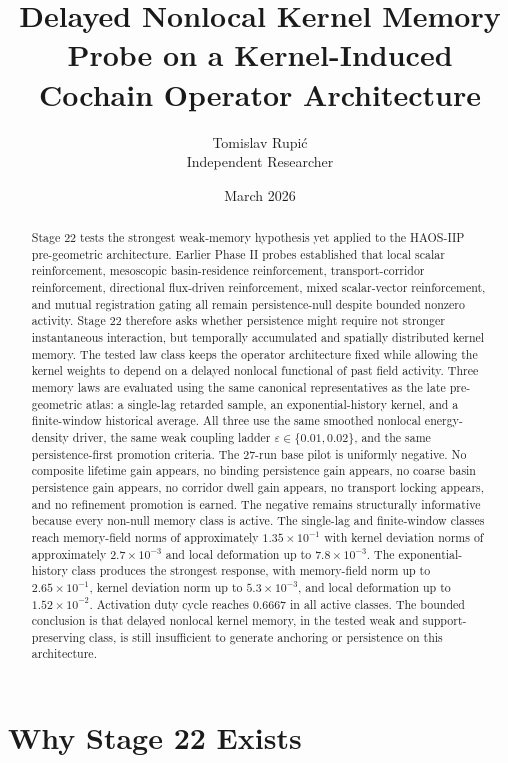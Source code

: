 \documentclass[11pt]{article}
\title{Delayed Nonlocal Kernel Memory Probe on a Kernel-Induced Cochain Operator Architecture}
\author{Tomislav Rupi\'c \\ Independent Researcher}
\date{March 2026}
\begin{document}
\maketitle

\begin{abstract}
Stage 22 tests the strongest weak-memory hypothesis yet applied to the HAOS-IIP pre-geometric architecture. Earlier Phase II probes established that local scalar reinforcement, mesoscopic basin-residence reinforcement, transport-corridor reinforcement, directional flux-driven reinforcement, mixed scalar-vector reinforcement, and mutual registration gating all remain persistence-null despite bounded nonzero activity. Stage 22 therefore asks whether persistence might require not stronger instantaneous interaction, but temporally accumulated and spatially distributed kernel memory. The tested law class keeps the operator architecture fixed while allowing the kernel weights to depend on a delayed nonlocal functional of past field activity. Three memory laws are evaluated using the same canonical representatives as the late pre-geometric atlas: a single-lag retarded sample, an exponential-history kernel, and a finite-window historical average. All three use the same smoothed nonlocal energy-density driver, the same weak coupling ladder $\varepsilon\in\{0.01,0.02\}$, and the same persistence-first promotion criteria. The 27-run base pilot is uniformly negative. No composite lifetime gain appears, no binding persistence gain appears, no coarse basin persistence gain appears, no corridor dwell gain appears, no transport locking appears, and no refinement promotion is earned. The negative remains structurally informative because every non-null memory class is active. The single-lag and finite-window classes reach memory-field norms of approximately $1.35\times10^{-1}$ with kernel deviation norms of approximately $2.7\times10^{-3}$ and local deformation up to $7.8\times10^{-3}$. The exponential-history class produces the strongest response, with memory-field norm up to $2.65\times10^{-1}$, kernel deviation norm up to $5.3\times10^{-3}$, and local deformation up to $1.52\times10^{-2}$. Activation duty cycle reaches $0.6667$ in all active classes. The bounded conclusion is that delayed nonlocal kernel memory, in the tested weak and support-preserving class, is still insufficient to generate anchoring or persistence on this architecture.
\end{abstract}

\section{Why Stage 22 Exists}
\end{document}
